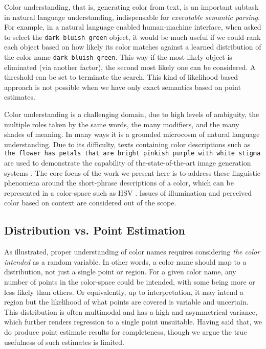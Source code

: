 \documentclass[]{book}
\newcommand{\parencite}{\citep}
\begin{document}
Color understanding, that is, generating color from text, is an important subtask in natural language understanding, indispensable for {\it executable semantic parsing}. 
For example, in a natural language enabled human-machine interface, when asked to select the \texttt{dark bluish green} object, it would be much useful if we could rank each object based on how likely its color matches against a learned distribution of the color name \texttt{dark bluish green}. 
This way if the most-likely object is eliminated (via another factor), the second most likely one can be considered.
A threshold can be set to terminate the search.
This kind of likelihood based approach is not possible when we have only exact semantics based on point estimates. 


Color understanding is a challenging domain, due to high levels of ambiguity, the multiple roles taken by the same words, the many modifiers, and the many shades of meaning.
In many ways it is a grounded microcosm of natural language understanding.
Due to its difficulty, texts containing color descriptions such as \texttt{the flower has petals that are bright pinkish purple with white stigma} are used to demonstrate the  capability of the-state-of-the-art image generation systems \parencite{reed2016generative, 2015arXiv151102793M}.
The core focus of the work we present here is to address these linguistic phenomena around the short-phrase descriptions of a color, which can be represented in a color-space such as HSV \parencite{smith1978color}.
Issues of illumination and perceived color based on context are considered out of the scope.

\subsection{Distribution vs. Point Estimation}
As illustrated, proper understanding of color names requires considering \emph{the color intended} as a random variable.
In other words, a color name should map to a distribution, not just a single point or region.
For a given color name, any number of points in the color-space could be intended, with some being more or less likely than others.
Or equivalently, up to interpretation, it may intend a region but the likelihood of what points are covered is variable and uncertain.
This distribution is often multimodal and has a high and asymmetrical variance, which further renders regression to a single point unsuitable.
Having said that, we do produce point estimate results for completeness, though we argue the true usefulness of such estimates is limited.
\end{document}
